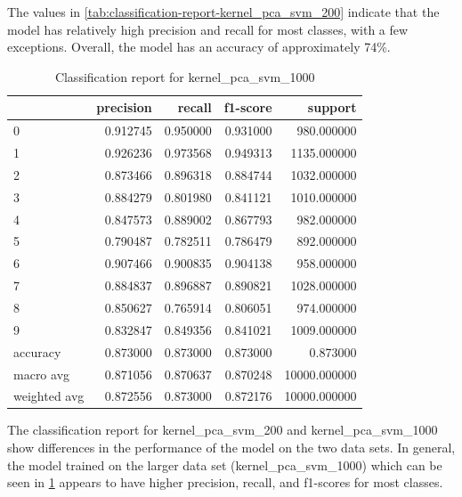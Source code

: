 The values in \ref{tab:classification-report-kernel_pca_svm_200} indicate that the model has relatively high precision and recall for most classes, with a few exceptions. Overall, the model has an accuracy of approximately 74\%.

\begin{table}[htb!]
    \centering
    \begin{tabular}{lrrrr}
        \toprule
        & precision & recall & f1-score & support \\
        \midrule
        0 & 0.912745 & 0.950000 & 0.931000 & 980.000000 \\
        1 & 0.926236 & 0.973568 & 0.949313 & 1135.000000 \\
        2 & 0.873466 & 0.896318 & 0.884744 & 1032.000000 \\
        3 & 0.884279 & 0.801980 & 0.841121 & 1010.000000 \\
        4 & 0.847573 & 0.889002 & 0.867793 & 982.000000 \\
        5 & 0.790487 & 0.782511 & 0.786479 & 892.000000 \\
        6 & 0.907466 & 0.900835 & 0.904138 & 958.000000 \\
        7 & 0.884837 & 0.896887 & 0.890821 & 1028.000000 \\
        8 & 0.850627 & 0.765914 & 0.806051 & 974.000000 \\
        9 & 0.832847 & 0.849356 & 0.841021 & 1009.000000 \\
    accuracy & 0.873000 & 0.873000 & 0.873000 & 0.873000 \\
    macro avg & 0.871056 & 0.870637 & 0.870248 & 10000.000000 \\
    weighted avg & 0.872556 & 0.873000 & 0.872176 & 10000.000000 \\
    \bottomrule
\end{tabular}
\caption{Classification report for kernel\_pca\_svm\_1000}
\label{tab:classification-report-kernel_pca_svm_1000}
    \end{table}

The classification report for kernel\_pca\_svm\_200 and kernel\_pca\_svm\_1000 show differences in the performance of the model on the two data sets. In general, the model trained on the larger data set (kernel\_pca\_svm\_1000) which can be seen in \ref{tab:classification-report-kernel_pca_svm_1000} appears to have higher precision, recall, and f1-scores for most classes. 

